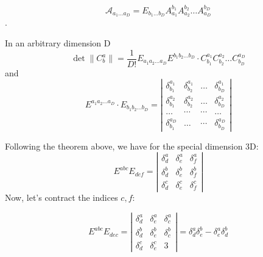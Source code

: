 \begin{equation}
\mathcal{A}_{a_{1} \ldots a_{D}}=E_{b_{1} \ldots b_{D}} A_{a_{1}}^{b_{1}} A_{a_{2}}^{b_{2}} \ldots A_{a_{D}}^{b_{D}}
\end{equation}
.
\begin{qt}
In an arbitrary dimension D
\begin{equation}
\operatorname{det}\left\|C_{b}^{a}\right\|=\frac{1}{D !} E_{a_{1} a_{2} \ldots a_{D}} E^{b_{1} b_{2} \ldots b_{D}} \cdot C_{b_{1}}^{a_{1}} C_{b_{2}}^{a_{2}} \ldots C_{b_{D}}^{a_{D}}
\end{equation}
and
\begin{equation}
E^{a_{1} a_{2} \ldots a_{D}} \cdot E_{b_{1} b_{2} \ldots b_{D}}=\left|\begin{array}{cccc}
{\delta_{b_{1}}^{a_{1}}} & {\delta_{b_{2}}^{a_{1}}} & {\ldots}&{ \delta_{b_{D}}^{a_{1}}} \\
{\delta_{b_{1}}^{a_{2}}} & {\delta_{b_{2}}^{a_{2}}} & {\ldots} & {\delta_{b_{D}}^{a_{2}}} \\
{\ldots} & {\cdots} & {\cdots} & {\ldots} \\
{\delta_{b_{1}}^{a_{D}}} & {\ldots} & {\cdots} & {\delta_{b_{D}}^{a_{D}}}
\end{array}\right|
\end{equation}
\end{qt}
Following the theorem above, we have for the special dimension 3D:
$$
E^{a b c} E_{d e f}=\left|\begin{array}{ccc}
{\delta_{d}^{a}} & {\delta_{e}^{a}} & {\delta_{f}^{a}} \\
{\delta_{d}^{b}} & {\delta_{e}^{b}} & {\delta_{f}^{b}} \\
{\delta_{d}^{c}} & {\delta_{e}^{c}} & {\delta_{f}^{c}}
\end{array}\right|
$$
Now, let's contract the indices $c,f$:
\begin{qt}
\begin{equation}
E^{a b c} E_{d e c}=\left|\begin{array}{ccc}
{\delta_{d}^{a}} & {\delta_{e}^{a}} & {\delta_{c}^{a}} \\
{\delta_{d}^{b}} & {\delta_{e}^{b}} & {\delta_{c}^{b}} \\
{\delta_{d}^{c}} & {\delta_{e}^{c}} & {3}
\end{array}\right|=\delta_{d}^{a} \delta_{e}^{b}-\delta_{e}^{a} \delta_{d}^{b}
\end{equation}
\end{qt}
